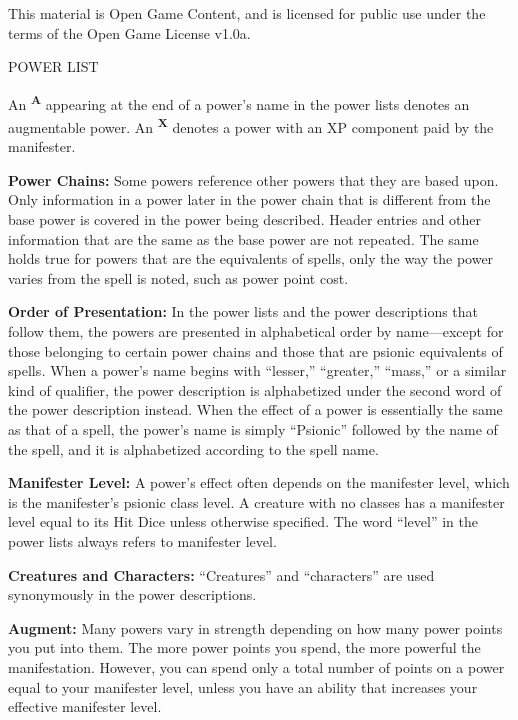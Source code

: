 \documentclass{article}
\begin{document}
This material is Open Game Content, and is licensed for public use under the terms 
of the Open Game License v1.0a.

{\LARGE{}POWER LIST}

\vspace{12pt}
An \textsuperscript{\textbf{A}}{\scriptsize{} }appearing at the end of a power's 
name in the power lists denotes an augmentable power. An \textsuperscript{\textbf{X}}{\scriptsize{} 
}denotes a power with an XP component paid by the manifester.

\textbf{Power Chains:} Some powers reference other powers that they are based upon. 
Only information in a power later in the power chain that is different from the 
base power is covered in the power being described. Header entries and other information 
that are the same as the base power are not repeated. The same holds true for powers 
that are the equivalents of spells, only the way the power varies from the spell 
is noted, such as power point cost.

\textbf{Order of Presentation:} In the power lists and the power descriptions that 
follow them, the powers are presented in alphabetical order by name---except for 
those belonging to certain power chains and those that are psionic equivalents 
of spells\textit{. }When a power's name begins with ``lesser,'' ``greater,'' ``mass,'' 
or a similar kind of qualifier, the power description is alphabetized under the 
second word of the power description instead. When the effect of a power is essentially 
the same as that of a spell, the power's name is simply ``Psionic'' followed by 
the name of the spell, and it is alphabetized according to the spell name.

\textbf{Manifester Level:} A power's effect often depends on the manifester level, 
which is the manifester's psionic class level. A creature with no classes has a 
manifester level equal to its Hit Dice unless otherwise specified. The word ``level'' 
in the power lists always refers to manifester level.

\textbf{Creatures and Characters:} ``Creatures'' and ``characters'' are used synonymously 
in the power descriptions.

\textbf{Augment:} Many powers vary in strength depending on how many power points 
you put into them. The more power points you spend, the more powerful the manifestation. 
However, you can spend only a total number of points on a power equal to your manifester 
level, unless you have an ability that increases your effective manifester level.
\end{document}
